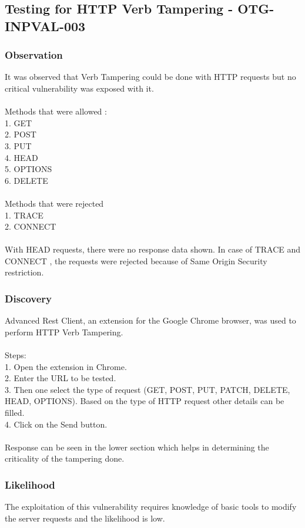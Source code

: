 \subsection{Testing for HTTP Verb Tampering - OTG-INPVAL-003}

\subsubsection{Observation}
It was observed that Verb Tampering could be done with HTTP requests but no critical vulnerability was exposed with it.\\
\\Methods that were allowed :\\
1. GET \\
2. POST \\
3. PUT \\
4. HEAD \\
5. OPTIONS \\
6. DELETE \\
\\Methods that were rejected \\
1. TRACE \\
2. CONNECT \\
\\With HEAD requests, there were no response data shown. In case of TRACE and CONNECT , the requests were rejected because of Same Origin Security restriction.


\subsubsection{Discovery}
Advanced Rest Client, an extension for the Google Chrome browser, was used to perform HTTP Verb Tampering.\\
\\Steps: \\
1. Open the extension in Chrome.\\
2. Enter the URL to be tested.\\
3. Then one select the type of request (GET, POST, PUT, PATCH, DELETE, HEAD, OPTIONS). Based on the type of HTTP request other details can be filled.\\
4. Click on the Send button.\\
\\Response can be seen in the lower section which helps in determining the criticality of the tampering done.

\subsubsection{Likelihood}
The exploitation of this vulnerability requires knowledge of basic tools to modify the server requests and the likelihood is low.


